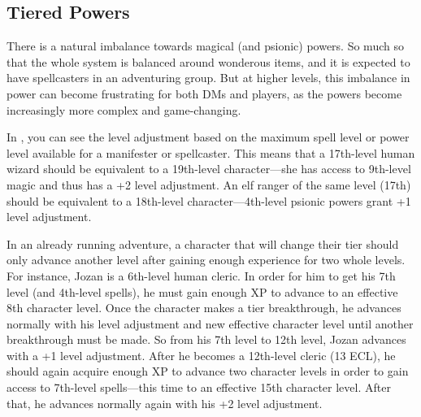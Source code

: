 \subsection{Tiered Powers}
There is a natural imbalance towards magical (and psionic) powers. So much so that the whole system is balanced around wonderous items, and it is expected to have spellcasters in an adventuring group. But at higher levels, this imbalance in power can become frustrating for both DMs and players, as the powers become increasingly more complex and game-changing.

In , you can see the level adjustment based on the maximum spell level or power level available for a manifester or spellcaster. This means that a 17th-level human wizard should be equivalent to a 19th-level character---she has access to 9th-level magic and thus has a +2 level adjustment. An elf ranger of the same level (17th) should be equivalent to a 18th-level character---4th-level psionic powers grant +1 level adjustment.


In an already running adventure, a character that will change their tier should only advance another level after gaining enough experience for two whole levels. For instance, Jozan is a 6th-level human cleric. In order for him to get his 7th level (and 4th-level spells), he must gain enough XP to advance to an effective 8th character level. Once the character makes a tier breakthrough, he advances normally with his level adjustment and new effective character level until another breakthrough must be made. So from his 7th level to 12th level, Jozan advances with a +1 level adjustment. After he becomes a 12th-level cleric (13 ECL), he should again acquire enough XP to advance two character levels in order to gain access to 7th-level spells---this time to an effective 15th character level. After that, he advances normally again with his +2 level adjustment.
